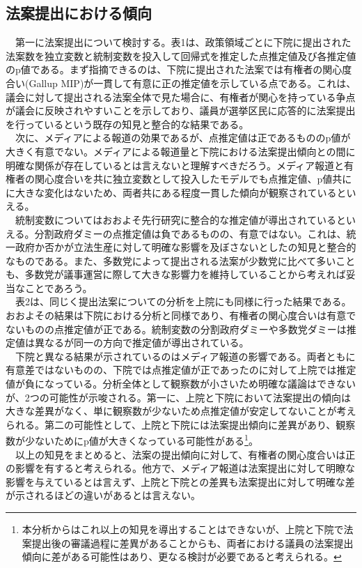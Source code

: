 \documentclass[here]{article}
\begin{document}
\subsection{法案提出における傾向}
　第一に法案提出について検討する。表1は、政策領域ごとに下院に提出された法案数を独立変数と統制変数を投入して回帰式を推定した点推定値及び各推定値のp値である。まず指摘できるのは、下院に提出された法案では有権者の関心度合い(Gallup MIP)が一貫して有意に正の推定値を示している点である。これは、議会に対して提出される法案全体で見た場合に、有権者が関心を持っている争点が議会に反映されやすいことを示しており、議員が選挙区民に応答的に法案提出を行っているという既存の知見と整合的な結果である。\citep*{Page1983-bx,Monroe1998-ty,Burstein2003-vs}\\
　次に、メディアによる報道の効果であるが、点推定値は正であるもののp値が大きく有意でない。メディアによる報道量と下院における法案提出傾向との間に明確な関係が存在しているとは言えないと理解すべきだろう。メディア報道と有権者の関心度合いを共に独立変数として投入したモデルでも点推定値、p値共にに大きな変化はないため、両者共にある程度一貫した傾向が観察されているといえる。\\
　統制変数についてはおおよそ先行研究に整合的な推定値が導出されているといえる。分割政府ダミーの点推定値は負であるものの、有意ではない。これは、統一政府か否かが立法生産に対して明確な影響を及ぼさないとした\citet*{Mayhew1991-rq}の知見と整合的なものである。また、多数党によって提出される法案が少数党に比べて多いことも、多数党が議事運営に際して大きな影響力を維持していることから考えれば妥当なことであろう。\citep*{Sinclair2016-kh,Cox2005-pn,Cox2007-xq}\\
　表2は、同じく提出法案についての分析を上院にも同様に行った結果である。おおよその結果は下院における分析と同様であり、有権者の関心度合いは有意でないものの点推定値が正である。統制変数の分割政府ダミーや多数党ダミーは推定値は異なるが同一の方向で推定値が導出されている。\\
　下院と異なる結果が示されているのはメディア報道の影響である。両者ともに有意差ではないものの、下院では点推定値が正であったのに対して上院では推定値が負になっている。分析全体として観察数が小さいため明確な議論はできないが、2つの可能性が示唆される。第一に、上院と下院において法案提出の傾向は大きな差異がなく、単に観察数が少ないため点推定値が安定してないことが考えられる。第二の可能性として、上院と下院には法案提出傾向に差異があり、観察数が少ないためにp値が大きくなっている可能性がある\footnote{本分析からはこれ以上の知見を導出することはできないが、上院と下院で法案提出後の審議過程に差異がある\citep*{Sinclair2016-kh}ことからも、両者における議員の法案提出傾向に差がある可能性はあり、更なる検討が必要であると考えられる。}。\\
　以上の知見をまとめると、法案の提出傾向に対して、有権者の関心度合いは正の影響を有すると考えられる。他方で、メディア報道は法案提出に対して明瞭な影響を与えているとは言えず、上院と下院との差異も法案提出に対して明確な差が示されるほどの違いがあるとは言えない。\\
\end{document}
